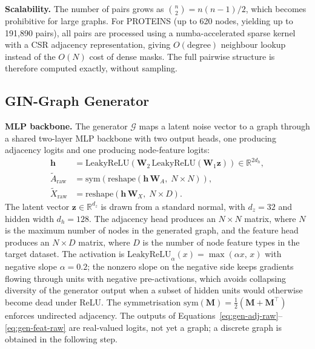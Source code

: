 \documentclass[12pt,a4paper]{article}
\begin{document}
\textbf{Scalability.} The number of pairs grows as $\binom{n}{2} = n(n-1)/2$, which becomes prohibitive for large graphs. For PROTEINS (up to 620 nodes, yielding up to 191{,}890 pairs), all pairs are processed using a numba-accelerated sparse kernel with a CSR adjacency representation, giving $O(\text{degree})$ neighbour lookup instead of the $O(N)$ cost of dense masks. The full pairwise structure is therefore computed exactly, without sampling.

\subsection{GIN-Graph Generator}
\label{sec:generator}

\textbf{MLP backbone.} The generator $\mathcal{G}$ maps a latent noise vector to a graph through a shared two-layer MLP backbone with two output heads, one producing adjacency logits and one producing node-feature logits:
\begin{align}
  \mathbf{h} &= \text{LeakyReLU}\!\left(\mathbf{W}_2\,\text{LeakyReLU}(\mathbf{W}_1 \mathbf{z})\right) \in \mathbb{R}^{2d_h}, \label{eq:gen-backbone} \\
  \tilde{A}_{\text{raw}} &= \text{sym}\!\left(\text{reshape}(\mathbf{h}\,\mathbf{W}_A,\; N \times N)\right), \label{eq:gen-adj-raw} \\
  \tilde{X}_{\text{raw}} &= \text{reshape}(\mathbf{h}\,\mathbf{W}_X,\; N \times D). \label{eq:gen-feat-raw}
\end{align}
The latent vector $\mathbf{z} \in \mathbb{R}^{d_z}$ is drawn from a standard normal, with $d_z = 32$ and hidden width $d_h = 128$. The adjacency head produces an $N \times N$ matrix, where $N$ is the maximum number of nodes in the generated graph, and the feature head produces an $N \times D$ matrix, where $D$ is the number of node feature types in the target dataset. The activation is $\text{LeakyReLU}_\alpha(x) = \max(\alpha x,\, x)$ with negative slope $\alpha = 0.2$; the nonzero slope on the negative side keeps gradients flowing through units with negative pre-activations, which avoids collapsing diversity of the generator output when a subset of hidden units would otherwise become dead under ReLU. The symmetrisation $\text{sym}(\mathbf{M}) = \tfrac{1}{2}(\mathbf{M} + \mathbf{M}^\top)$ enforces undirected adjacency. The outputs of Equations~\eqref{eq:gen-adj-raw}--\eqref{eq:gen-feat-raw} are real-valued logits, not yet a graph; a discrete graph is obtained in the following step.
\end{document}

